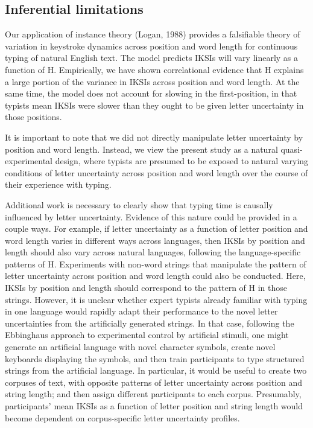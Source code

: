 \documentclass[,man,floatsintext]{apa6}
\begin{document}
\hypertarget{inferential-limitations}{%
\subsection{Inferential limitations}\label{inferential-limitations}}

Our application of instance theory (Logan, 1988) provides a falsifiable theory of variation in keystroke dynamics across position and word length for continuous typing of natural English text. The model predicts IKSIs will vary linearly as a function of H. Empirically, we have shown correlational evidence that H explains a large portion of the variance in IKSIs across position and word length. At the same time, the model does not account for slowing in the first-position, in that typists mean IKSIs were slower than they ought to be given letter uncertainty in those positions.

It is important to note that we did not directly manipulate letter uncertainty by position and word length. Instead, we view the present study as a natural quasi-experimental design, where typists are presumed to be exposed to natural varying conditions of letter uncertainty across position and word length over the course of their experience with typing.

Additional work is necessary to clearly show that typing time is causally influenced by letter uncertainty. Evidence of this nature could be provided in a couple ways. For example, if letter uncertainty as a function of letter position and word length varies in different ways across languages, then IKSIs by position and length should also vary across natural languages, following the language-specific patterns of H. Experiments with non-word strings that manipulate the pattern of letter uncertainty across position and word length could also be conducted. Here, IKSIs by position and length should correspond to the pattern of H in those strings. However, it is unclear whether expert typists already familiar with typing in one language would rapidly adapt their performance to the novel letter uncertainties from the artificially generated strings. In that case, following the Ebbinghaus approach to experimental control by artificial stimuli, one might generate an artificial language with novel character symbols, create novel keyboards displaying the symbols, and then train participants to type structured strings from the artificial language. In particular, it would be useful to create two corpuses of text, with opposite patterns of letter uncertainty across position and string length; and then assign different participants to each corpus. Presumably, participants' mean IKSIs as a function of letter position and string length would become dependent on corpus-specific letter uncertainty profiles.
\end{document}
